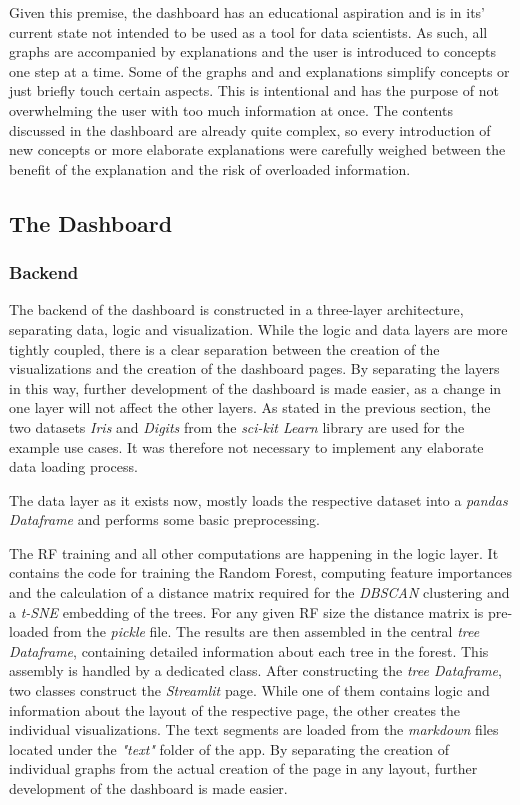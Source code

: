 \documentclass[a4paper, 12pt]{article}
\begin{document}
Given this premise, the dashboard has an educational aspiration and is in its' current state
not intended to be used as a tool for data scientists. As such, all graphs are accompanied by
explanations and the user is introduced to concepts one step at a time. Some of the graphs and
and explanations simplify concepts or just briefly touch certain aspects. This is intentional
and has the purpose of not overwhelming the user with too much information at once. The contents
discussed in the dashboard are already quite complex, so every introduction of new concepts
or more elaborate explanations were carefully weighed between the benefit of the explanation
and the risk of overloaded information.

\subsection{The Dashboard}
\subsubsection{Backend}
The backend of the dashboard is constructed in a three-layer architecture, separating data,
logic and visualization. While the logic and data layers are more tightly coupled, there is
a clear separation between the creation of the visualizations and the creation of the
dashboard pages. By separating the layers in this way, further development of the dashboard is
made easier, as a change in one layer will not affect the other layers. As stated in the
previous section, the two datasets \textit{Iris} and \textit{Digits} from the
\textit{sci-kit Learn} library are used for the example use cases. It was therefore not
necessary to implement any elaborate data loading process. \par

The data layer as it exists now, mostly loads the respective dataset into a
\textit{pandas Dataframe} and performs some basic preprocessing. \par

The RF training and all other computations are happening in the logic layer. It
contains the code for training the Random Forest, computing feature importances and the calculation
of a distance matrix required for the \textit{DBSCAN} clustering and a\textit{ t-SNE} embedding
of the trees. For any given RF size the distance matrix is pre-loaded from the
\textit{pickle} file. The results are then assembled in the central \textit{tree Dataframe}, containing
detailed information about each tree in the forest. This assembly is handled by a dedicated class.
After constructing the \textit{tree Dataframe}, two classes construct the \textit{Streamlit} page.
While one of them contains logic and information about the layout of the respective page, the other
creates the individual visualizations. The text segments are loaded from the \textit{markdown} files
located under the \textit{"text"} folder of the app. By separating the creation of individual graphs
from the actual creation of the page in any layout, further development of the dashboard is made
easier.
\end{document}
